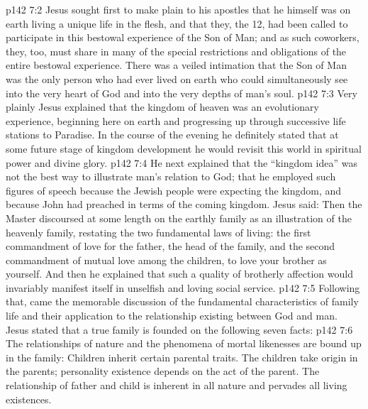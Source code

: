 \vs p142 7:2 Jesus sought first to make plain to his apostles that he himself was on earth living a unique life in the flesh, and that they, the 12, had been called to participate in this bestowal experience of the Son of Man; and as such coworkers, they, too, must share in many of the special restrictions and obligations of the entire bestowal experience. There was a veiled intimation that the Son of Man was the only person who had ever lived on earth who could simultaneously see into the very heart of God and into the very depths of man’s soul.
\vs p142 7:3 Very plainly Jesus explained that the kingdom of heaven was an evolutionary experience, beginning here on earth and progressing up through successive life stations to Paradise. In the course of the evening he definitely stated that at some future stage of kingdom development he would revisit this world in spiritual power and divine glory.
\vs p142 7:4 He next explained that the “kingdom idea” was not the best way to illustrate man’s relation to God; that he employed such figures of speech because the Jewish people were expecting the kingdom, and because John had preached in terms of the coming kingdom. Jesus said:  Then the Master discoursed at some length on the earthly family as an illustration of the heavenly family, restating the two fundamental laws of living: the first commandment of love for the father, the head of the family, and the second commandment of mutual love among the children, to love your brother as yourself. And then he explained that such a quality of brotherly affection would invariably manifest itself in unselfish and loving social service.
\vs p142 7:5 Following that, came the memorable discussion of the fundamental characteristics of family life and their application to the relationship existing between God and man. Jesus stated that a true family is founded on the following seven facts:
\vs p142 7:6 \bibnobreakspace {} The relationships of nature and the phenomena of mortal likenesses are bound up in the family: Children inherit certain parental traits. The children take origin in the parents; personality existence depends on the act of the parent. The relationship of father and child is inherent in all nature and pervades all living existences.
